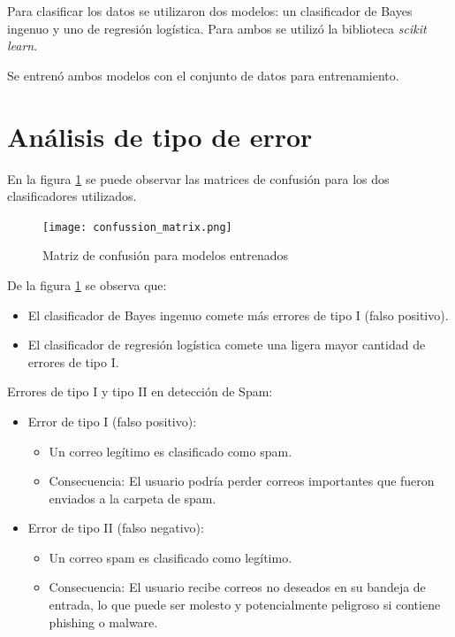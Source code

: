 \documentclass[onecolumn]{IEEEtran}
\begin{document}
Para clasificar los datos se utilizaron dos modelos: un clasificador de Bayes ingenuo y uno de regresión logística. Para ambos se utilizó la biblioteca \textit{scikit learn}.

Se entrenó ambos modelos con el conjunto de datos para entrenamiento.

\section*{Análisis de tipo de error}

En la figura \ref{fig:confussion-matrix} se puede observar las matrices de confusión para los dos clasificadores utilizados.

\begin{figure}[ht]
    \centering
    \texttt{[image: confussion\_matrix.png]}
    \caption{Matriz de confusión para modelos entrenados}
    \label{fig:confussion-matrix}
\end{figure}

De la figura \ref{fig:confussion-matrix} se observa que:
\begin{itemize}
    \item El clasificador de Bayes ingenuo comete más errores de tipo I (falso positivo).
    \item El clasificador de regresión logística comete una ligera mayor cantidad de errores de tipo I.
\end{itemize}

Errores de tipo I y tipo II en detección de Spam:

\begin{itemize}
    \item Error de tipo I (falso positivo):
    \begin{itemize}
        \item Un correo legítimo es clasificado como spam.
        \item Consecuencia: El usuario podría perder correos importantes que fueron enviados a la carpeta de spam.
    \end{itemize}
    \item Error de tipo II (falso negativo):
    \begin{itemize}
        \item Un correo spam es clasificado como legítimo.
        \item Consecuencia: El usuario recibe correos no deseados en su bandeja de entrada, lo que puede ser molesto y potencialmente peligroso si contiene phishing o malware.
    \end{itemize}
\end{itemize}
\end{document}
